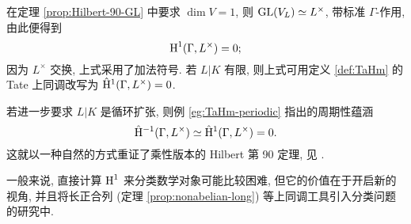 \begin{example}\label{eg:multiplicative-90-finite}
	在定理 \ref{prop:Hilbert-90-GL} 中要求 $\dim V = 1$, 则 $\operatorname{GL}(V_L) \simeq L^\times$, 带标准 $\Gamma$-作用, 由此便得到
	\[ \operatorname{H}^1(\Gamma, L^\times) = 0; \]
	因为 $L^\times$ 交换, 上式采用了加法符号. 若 $L|K$ 有限, 则上式可用定义 \ref{def:TaHm} 的 Tate 上同调改写为 $\hat{\mathrm{H}}^1(\Gamma, L^\times) = 0$.
	
	若进一步要求 $L|K$ 是循环扩张, 则例 \ref{eg:TaHm-periodic} 指出的周期性蕴涵
	\[ \hat{\mathrm{H}}^{-1}(\Gamma, L^\times) \simeq \hat{\mathrm{H}}^1(\Gamma, L^\times) = 0. \]
	这就以一种自然的方式重证了乘性版本的 Hilbert 第 90 定理, 见 \cite[定理 9.6.9]{Li1}.
\end{example}

一般来说, 直接计算 $\operatorname{H}^1$ 来分类数学对象可能比较困难, 但它的价值在于开启新的视角, 并且将长正合列 (定理 \ref{prop:nonabelian-long}) 等上同调工具引入分类问题的研究中.



